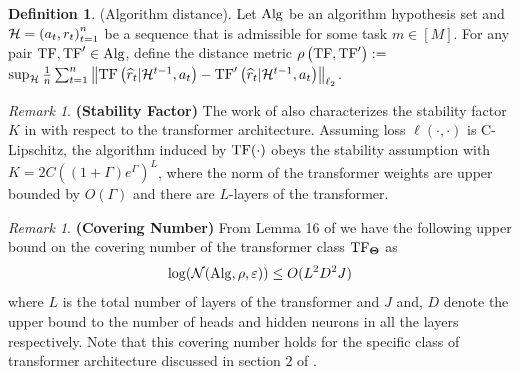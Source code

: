 \documentclass[10pt]{article}
\theoremstyle{plain}
\theoremstyle{definition}
\newtheorem{definition}[theorem]{Definition}
\theoremstyle{remark}
\newtheorem{remark}[theorem]{Remark}
\begin{document}
\begin{definition}(Algorithm distance).
\label{def:alg-dist}
Let $\mathrm{Alg}$ be an algorithm hypothesis set and $\mathcal{H}=\left(a_t, r_t\right)_{t=1}^n$ be a sequence that is admissible for some task $m \in[M]$. For any pair $\mathrm{TF}, \mathrm{TF}^{\prime} \in \mathrm{Alg}$, define the distance metric $\rho\left(\mathrm{TF}, \mathrm{TF}^{\prime}\right):=$ $\sup_{\mathcal{H}} \frac{1}{n} \sum_{t=1}^n\left\|\mathrm{TF}\left(\widehat{r}_t|\mathcal{H}^{t-1}, a_t\right)-\mathrm{TF}^{\prime}\left(\widehat{r}_t|\mathcal{H}^{t-1}, a_t\right)\right\|_{\ell_2}$.
\end{definition}
\begin{remark}\textbf{(Stability Factor)}
\label{remark:stability}
The work of \citet{li2023transformers} also characterizes the stability factor $K$ in  with respect to the transformer architecture. Assuming loss $\ell(\cdot, \cdot)$ is C-Lipschitz, the algorithm induced by $\mathrm{TF}(\cdot)$ obeys the stability assumption with $K=2 C\left((1+\Gamma) e^{\Gamma}\right)^L$, where the norm of the transformer weights are upper bounded by $O(\Gamma)$ and there are $L$-layers of the transformer.
\end{remark}
\begin{remark}\textbf{(Covering Number)}
\label{remark:covering-number}
From Lemma 16 of \citet{lin2023transformers} we have the following upper bound on the covering number of the transformer class $\mathrm{TF}_{\mathbf{\Theta}}$ as
\begin{align*}
    \log(\mathcal{N}(\mathrm{Alg}, \rho, \varepsilon))\leq O(L^2D^2J)
\end{align*}
where $L$ is the total number of layers of the transformer and $J$ and, $D$ denote the upper bound to the number of heads and hidden neurons in all the layers respectively. Note that this covering number holds for the specific class of transformer architecture discussed in section $2$ of \citep{lin2023transformers}.
\end{remark}
\end{document}
